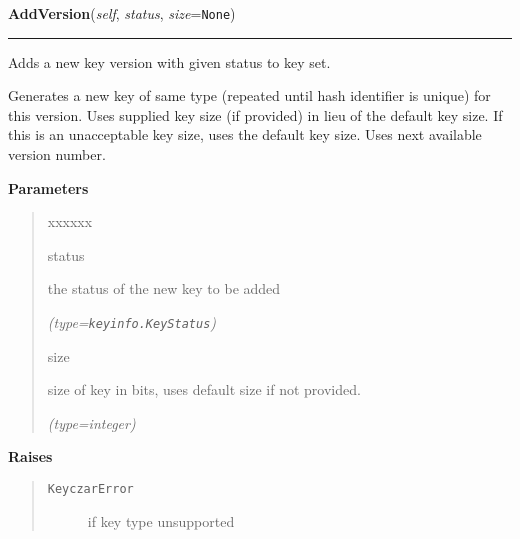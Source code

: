     \label{keyczar:keyczar:Keyczar:AddVersion}

    \vspace{0.5ex}

\hspace{.8\funcindent}\begin{boxedminipage}{\funcwidth}

    \raggedright \textbf{AddVersion}(\textit{self}, \textit{status}, \textit{size}={\tt None})

    \vspace{-1.5ex}

    \rule{\textwidth}{0.5\fboxrule}
\setlength{\parskip}{2ex}
    Adds a new key version with given status to key set.

    Generates a new key of same type (repeated until hash identifier is 
    unique) for this version. Uses supplied key size (if provided) in lieu 
    of the default key size. If this is an unacceptable key size, uses the 
    default key size. Uses next available version number.

\setlength{\parskip}{1ex}
      \textbf{Parameters}
      \vspace{-1ex}

      \begin{quote}
        \begin{Ventry}{xxxxxx}

          \item[status]

          the status of the new key to be added

            {\it (type=\texttt{keyinfo.KeyStatus})}

          \item[size]

          size of key in bits, uses default size if not provided.

            {\it (type=integer)}

        \end{Ventry}

      \end{quote}

      \textbf{Raises}
    \vspace{-1ex}

      \begin{quote}
        \begin{description}

          \item[\texttt{KeyczarError}]

          if key type unsupported

        \end{description}

      \end{quote}

    \end{boxedminipage}

